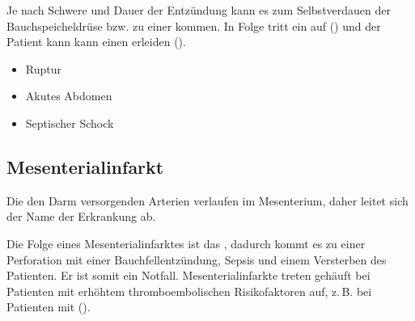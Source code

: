 {Je nach Schwere und Dauer der Entzündung kann es zum
Selbstverdauen der Bauchspeicheldrüse bzw. zu einer
 kommen. In Folge tritt ein
 auf
() und der Patient kann
kann einen  erleiden ().

}
{\begin{itemize}
  \item Ruptur
  \item Akutes Abdomen
  \item Septischer Schock
\end{itemize}}
{}
{}
{}



\subsection{Mesenterialinfarkt}
\label{topic:mesenterialinfarkt}

{\TxBeschreibung}
{ Die den
Darm versorgenden Arterien verlaufen im Mesenterium, 
daher leitet sich der Name der Erkrankung ab.


Die Folge eines Mesenterialinfarktes ist das , dadurch kommt es zu
einer Perforation mit einer Bauchfellentzündung, Sepsis und
einem Versterben des Patienten.
Er ist somit ein 
Notfall. 
Mesenterialinfarkte treten gehäuft bei Patienten mit
erhöhtem thromboembolischen Risikofaktoren auf, z.\,B. bei
Patienten mit
().

}
{}
{}
{}
{}


